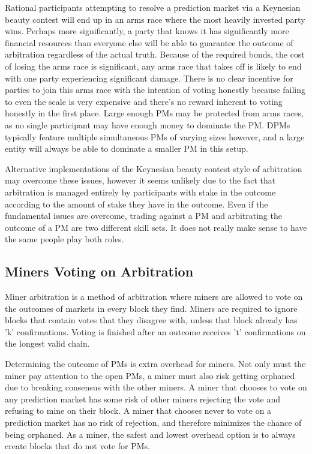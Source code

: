 \documentclass[onecolumn]{article}
\begin{document}
Rational participants attempting to resolve a prediction market via a Keynesian beauty contest will end up in an arms race where the most heavily invested party wins.
Perhaps more significantly, a party that knows it has significantly more financial resources than everyone else will be able to guarantee the outcome of arbitration regardless of the actual truth.
Because of the required bonds, the cost of losing the arms race is significant, any arms race that takes off is likely to end with one party experiencing significant damage.
There is no clear incentive for parties to join this arms race with the intention of voting honestly because failing to even the scale is very expensive and there's no reward inherent to voting honestly in the first place.
Large enough PMs may be protected from arms races, as no single participant may have enough money to dominate the PM.
DPMs typically feature multiple simultaneous PMs of varying sizes however, and a large entity will always be able to dominate a smaller PM in this setup.

Alternative implementations of the Keynesian beauty contest style of arbitration may overcome these issues,
however it seems unlikely due to the fact that arbitration is managed entirely by participants with stake in the outcome according to the amount of stake they have in the outcome.
Even if the fundamental issues are overcome, trading against a PM and arbitrating the outcome of a PM are two different skill sets.
It does not really make sense to have the same people play both roles.

\subsection{Miners Voting on Arbitration}
Miner arbitration \cite{pmob} is a method of arbitration where miners are allowed to vote on the outcomes of markets in every block they find.
Miners are required to ignore blocks that contain votes that they disagree with, unless that block already has 'k' confirmations.
Voting is finished after an outcome receives 't' confirmations on the longest valid chain.

Determining the outcome of PMs is extra overhead for miners.
Not only must the miner pay attention to the open PMs, a miner must also risk getting orphaned due to breaking consensus with the other miners.
A miner that chooses to vote on any prediction market has some risk of other miners rejecting the vote and refusing to mine on their block.
A miner that chooses never to vote on a prediction market has no risk of rejection, and therefore minimizes the chance of being orphaned.
As a miner, the safest and lowest overhead option is to always create blocks that do not vote for PMs.
\end{document}
